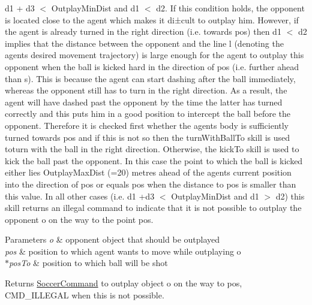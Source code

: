 \begin{DoxyItemize}
\item d1 + d3 $<$ Outplay\+Min\+Dist and d1 $<$ d2. If this condition holds, the opponent is located close to the agent which makes it di±cult to outplay him. However, if the agent is already turned in the right direction (i.\+e. towards \textquotesingle{}pos\textquotesingle{}) then d1 $<$ d2 implies that the distance between the opponent and the line l (denoting the agent\textquotesingle{}s desired movement trajectory) is large enough for the agent to outplay this opponent when the ball is kicked hard in the direction of \textquotesingle{}pos\textquotesingle{} (i.\+e. further ahead than s). This is because the agent can start dashing after the ball immediately, whereas the opponent still has to turn in the right direction. As a result, the agent will have dashed past the opponent by the time the latter has turned correctly and this puts him in a good position to intercept the ball before the opponent. Therefore it is checked first whether the agent\textquotesingle{}s body is sufficiently turned towards \textquotesingle{}pos\textquotesingle{} and if this is not so then the turn\+With\+Ball\+To skill is used toturn with the ball in the right direction. Otherwise, the kick\+To skill is used to kick the ball past the opponent. In this case the point to which the ball is kicked either lies Outplay\+Max\+Dist (=20) metres ahead of the agent\textquotesingle{}s current position into the direction of \textquotesingle{}pos\textquotesingle{} or equals \textquotesingle{}pos\textquotesingle{} when the distance to \textquotesingle{}pos\textquotesingle{} is smaller than this value. In all other cases (i.\+e. d1 +d3 $<$ Outplay\+Min\+Dist and d1 $>$ d2) this skill returns an illegal command to indicate that it is not possible to outplay the opponent o on the way to the point \textquotesingle{}pos\textquotesingle{}. 
\begin{DoxyParams}{Parameters}
{\em o} & opponent object that should be outplayed \\
\hline
{\em pos} & position to which agent wants to move while outplaying \textquotesingle{}o\textquotesingle{} \\
\hline
{\em $\ast$pos\+To} & position to which ball will be shot \\
\hline
\end{DoxyParams}
\begin{DoxyReturn}{Returns}
\hyperlink{classSoccerCommand}{Soccer\+Command} to outplay object o on the way to \textquotesingle{}pos\textquotesingle{}, C\+M\+D\+\_\+\+I\+L\+L\+E\+G\+AL when this is not possible. 
\end{DoxyReturn}

\end{DoxyItemize}
